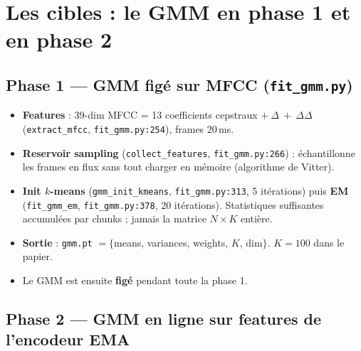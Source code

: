 \documentclass[11pt,a4paper]{article}
\newcommand{\code}[1]{\texttt{#1}}
\newcommand{\file}[1]{\texttt{#1}}
\begin{document}
\section{Les cibles : le GMM en phase 1 et en phase 2}

\subsection{Phase 1 --- GMM figé sur MFCC (\file{fit\_gmm.py})}

\begin{itemize}[leftmargin=*]
  \item \textbf{Features} : 39-dim MFCC = 13 coefficients cepstraux $+\ \Delta\ +\
  \Delta\Delta$ (\code{extract\_mfcc}, \file{fit\_gmm.py:254}), frames 20\,ms.
  \item \textbf{Reservoir sampling} (\code{collect\_features},
  \file{fit\_gmm.py:266}) : échantillonne les frames en flux sans tout charger
  en mémoire (algorithme de Vitter).
  \item \textbf{Init $k$-means} (\code{gmm\_init\_kmeans},
  \file{fit\_gmm.py:313}, 5 itérations) puis \textbf{EM}
  (\code{fit\_gmm\_em}, \file{fit\_gmm.py:378}, 20 itérations). Statistiques
  suffisantes accumulées par chunks ; jamais la matrice $N\times K$ entière.
  \item \textbf{Sortie} : \file{gmm.pt} $=\{$means, variances, weights, $K$,
  dim$\}$. $K=100$ dans le papier.
  \item Le GMM est ensuite \textbf{figé} pendant toute la phase 1.
\end{itemize}

\subsection{Phase 2 --- GMM en ligne sur features de l'encodeur EMA}
\end{document}
